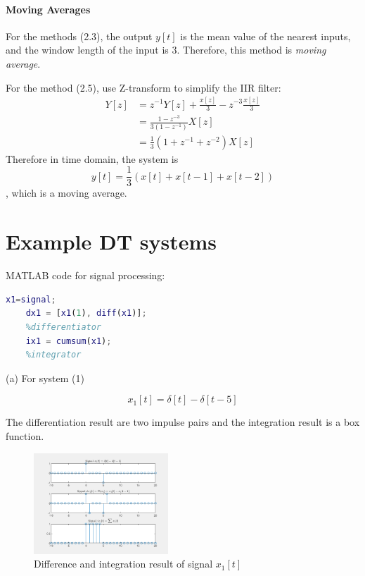 \documentclass[conference]{IEEEtran}
\begin{document}
\paragraph{Moving Averages}
For the methods (2.3), the output \(y[t]\) is the mean value of the nearest inputs, and the window length of the input is 3. Therefore, this method is \textit{moving average}.

For the method (2.5), use Z-transform to simplify the IIR filter:
\begin{equation}
	\begin{aligned}
		Y[z] & =z^{-1}Y[z]+\frac{x[z]}{3}-z^{-3}\frac{x[z]}{3} \\
		     & =\frac{1-z^{-3}}{3(1-z^{-1})}X[z]               \\
		     & =\frac{1}{3}(1+z^{-1}+z^{-2})X[z]
	\end{aligned}
\end{equation}
Therefore in time domain, the system is
\begin{equation}
	y[t]=\frac{1}{3}(x[t]+x[t-1]+x[t-2])
\end{equation}
, which is a moving average.

\section{Example DT systems}

MATLAB code for signal processing:
\begin{lstlisting}[language=matlab, style=matlab]
	x1=signal;
	dx1 = [x1(1), diff(x1)];
	%differentiator
	ix1 = cumsum(x1);
	%integrator
\end{lstlisting}

(a) For system (1)

\begin{equation}
	x_{1}[t]=\delta [t]-\delta [t-5]
\end{equation}

The differentiation result are two impulse pairs and the integration result is a box function.
\begin{figure}[htpb]
	\begin{center}
		\includegraphics[width=0.45\textwidth]{../matlab/q23_1.png}
		\caption{Difference and integration result of signal \(x_{1}[t]\)}
		\label{fig:11}
	\end{center}
\end{figure}
\end{document}
